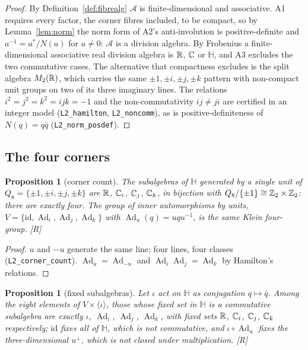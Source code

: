 \documentclass[11pt,a4paper]{article}
\theoremstyle{plain}
\newtheorem{proposition}[theorem]{Proposition}
\theoremstyle{definition}
\theoremstyle{remark}
\newcommand{\Hquat}{\mathbb{H}}
\newcommand{\Ad}{\operatorname{Ad}}
\newcommand{\rigR}{[\textup{R}]}
\begin{document}
\begin{proof}
By Definition~\ref{def:fibrealg} $\mathcal{A}$ is finite-dimensional and associative. A1 requires every factor, the corner fibres included, to be compact, so by Lemma~\ref{lem:norm} the norm form of A2's anti-involution is positive-definite and $a^{-1}=a^{*}/N(a)$ for $a\neq0$: $\mathcal{A}$ is a division algebra. By Frobenius \cite{Frobenius1878} a finite-dimensional associative real division algebra is $\mathbb{R}$, $\mathbb{C}$ or $\Hquat$, and A3 excludes the two commutative cases. The alternative that compactness excludes is the split algebra $M_{2}(\mathbb{R})$, which carries the same $\pm1,\pm i,\pm j,\pm k$ pattern with non-compact unit groups on two of its three imaginary lines. The relations $i^{2}=j^{2}=k^{2}=ijk=-1$ and the non-commutativity $ij\neq ji$ are certified in an integer model (\texttt{L2\_hamilton}, \texttt{L2\_noncomm}), as is positive-definiteness of $N(q)=q\bar q$ (\texttt{L2\_norm\_posdef}).
\end{proof}

\subsection{The four corners}

\begin{proposition}[corner count]\label{prop:corners}
The subalgebras of $\Hquat$ generated by a single unit of $Q_{8}=\{\pm1,\pm i,\pm j,\pm k\}$ are $\mathbb{R}$, $\mathbb{C}_{i}$, $\mathbb{C}_{j}$, $\mathbb{C}_{k}$, in bijection with $Q_{8}/\{\pm1\}\cong\mathbb{Z}_{2}\times\mathbb{Z}_{2}$: there are exactly four. The group of inner automorphisms by units, $V=\{\mathrm{id},\Ad_{i},\Ad_{j},\Ad_{k}\}$ with $\Ad_{u}(q)=uqu^{-1}$, is the same Klein four-group. \rigR
\end{proposition}

\begin{proof}
$u$ and $-u$ generate the same line; four lines, four classes (\texttt{L2\_corner\_count}). $\Ad_{u}=\Ad_{-u}$ and $\Ad_{i}\Ad_{j}=\Ad_{k}$ by Hamilton's relations.
\end{proof}

\begin{proposition}[fixed subalgebras]\label{prop:fixed}
Let $\iota$ act on $\Hquat$ as conjugation $q\mapsto\bar q$. Among the eight elements of $V\times\langle\iota\rangle$, those whose fixed set in $\Hquat$ is a commutative subalgebra are exactly $\iota$, $\Ad_{i}$, $\Ad_{j}$, $\Ad_{k}$, with fixed sets $\mathbb{R}$, $\mathbb{C}_{i}$, $\mathbb{C}_{j}$, $\mathbb{C}_{k}$ respectively; $\mathrm{id}$ fixes all of $\Hquat$, which is not commutative, and $\iota\circ\Ad_{u}$ fixes the three-dimensional $u^{\perp}$, which is not closed under multiplication. \rigR
\end{proposition}
\end{document}
